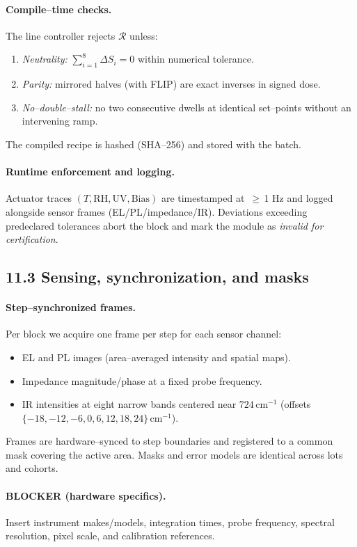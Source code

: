 \documentclass[12pt]{article}
\begin{document}
\paragraph{Compile–time checks.}
The line controller rejects $\mathcal{R}$ unless:
\begin{enumerate}
  \item \emph{Neutrality:} $\sum_{i=1}^{8}\Delta S_i=0$ within numerical tolerance.
  \item \emph{Parity:} mirrored halves (with FLIP) are exact inverses in signed dose.
  \item \emph{No–double–stall:} no two consecutive dwells at identical set–points without an intervening ramp.
\end{enumerate}
The compiled recipe is hashed (SHA–256) and stored with the batch.

\paragraph{Runtime enforcement and logging.}
Actuator traces $(T,\mathrm{RH},\mathrm{UV},\mathrm{Bias})$ are timestamped at \,$\ge$\,1 Hz and logged alongside sensor frames (EL/PL/impedance/IR). Deviations exceeding predeclared tolerances abort the block and mark the module as \emph{invalid for certification}.

\subsection*{11.3 Sensing, synchronization, and masks}
\paragraph{Step–synchronized frames.}
Per block we acquire one frame per step for each sensor channel:
\begin{itemize}
  \item EL and PL images (area–averaged intensity and spatial maps).
  \item Impedance magnitude/phase at a fixed probe frequency.
  \item IR intensities at eight narrow bands centered near $724\,\mathrm{cm}^{-1}$ (offsets $\{-18,-12,-6,0,6,12,18,24\}\,\mathrm{cm}^{-1}$).
\end{itemize}
Frames are hardware–synced to step boundaries and registered to a common mask covering the active area. Masks and error models are identical across lots and cohorts.

\paragraph{BLOCKER (hardware specifics).}
Insert instrument makes/models, integration times, probe frequency, spectral resolution, pixel scale, and calibration references.
\end{document}
